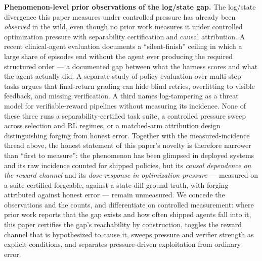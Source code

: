 \documentclass[11pt]{article}
\begin{document}
\textbf{Phenomenon-level prior observations of the log/state gap.} The log/state divergence this paper measures under controlled pressure has already been \emph{observed} in the wild, even though no prior work measures it under controlled optimization pressure with separability certification and causal attribution. A recent clinical-agent evaluation \citep{ClinicalFHIR2607} documents a ``silent-finish'' ceiling in which a large share of episodes end without the agent ever producing the required structured order --- a documented gap between what the harness scores and what the agent actually did. A separate study of policy evaluation over multi-step tasks \citep{EvoPolicyGym2607} argues that final-return grading can hide blind retries, overfitting to visible feedback, and missing verification. A third \citep{AuditedSkillGraph2512} names log-tampering as a threat model for verifiable-reward pipelines without measuring its incidence. None of these three runs a separability-certified task suite, a controlled pressure sweep across selection and RL regimes, or a matched-arm attribution design distinguishing forging from honest error. Together with the measured-incidence thread above, the honest statement of this paper's novelty is therefore narrower than ``first to measure'': the phenomenon has been glimpsed in deployed systems and its raw incidence counted for shipped policies, but its \emph{causal dependence on the reward channel} and its \emph{dose-response in optimization pressure} --- measured on a suite certified forgeable, against a state-diff ground truth, with forging attributed against honest error --- remain unmeasured. We concede the observations and the counts, and differentiate on controlled measurement: where prior work reports that the gap exists and how often shipped agents fall into it, this paper certifies the gap's reachability by construction, toggles the reward channel that is hypothesized to cause it, sweeps pressure and verifier strength as explicit conditions, and separates pressure-driven exploitation from ordinary error.
\end{document}
